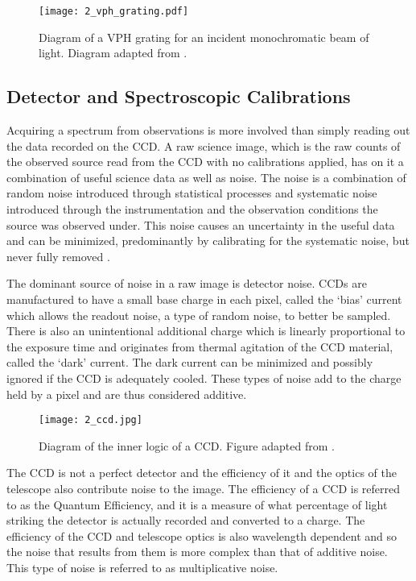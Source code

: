 \begin{figure}[t]
    \centering
    \texttt{[image: 2\_vph\_grating.pdf]}
    \caption{
        Diagram of a \gls{VPH} grating for an incident monochromatic beam of light.
        Diagram adapted from \cite{BirneyObsAstro}.
    }
    \label{fig:vph_grating}
\end{figure}

\subsection{Detector and Spectroscopic Calibrations} \label{subsec:calibration}

Acquiring a spectrum from observations is more involved than simply reading out the data recorded on the \gls{CCD}.
A raw science image, which is the raw counts of the observed source read from the \gls{CCD} with no calibrations applied, has on it a combination of useful science data as well as noise.
The noise is a combination of random noise introduced through statistical processes and systematic noise introduced through the instrumentation and the observation conditions the source was observed under.
This noise causes an uncertainty in the useful data and can be minimized, predominantly by calibrating for the systematic noise, but never fully removed \citep{CCDhandbook}.

The dominant source of noise in a raw image is detector noise.
\glspl{CCD} are manufactured to have a small base charge in each pixel, called the `bias' current which allows the readout noise, a type of random noise, to better be sampled.
There is also an unintentional additional charge which is linearly proportional to the exposure time and originates from thermal agitation of the \gls{CCD} material, called the `dark' current.
The dark current can be minimized and possibly ignored if the \gls{CCD} is adequately cooled.
These types of noise add to the charge held by a pixel and are thus considered additive.

\pagebreak

\begin{figure}[t]
    \centering
    \texttt{[image: 2\_ccd.jpg]}
    \caption{
        Diagram of the inner logic of a \gls{CCD}.
        Figure adapted from \cite{ccd_fig}.
    }
    \label{fig:ccd_diagram}
\end{figure}

The \gls{CCD} is not a perfect detector and the efficiency of it and the optics of the telescope also contribute noise to the image.
The efficiency of a \gls{CCD} is referred to as the Quantum Efficiency, and it is a measure of what percentage of light striking the detector is actually recorded and converted to a charge.
The efficiency of the \gls{CCD} and telescope optics is also wavelength dependent and so the noise that results from them is more complex than that of additive noise.
This type of noise is referred to as multiplicative noise.

